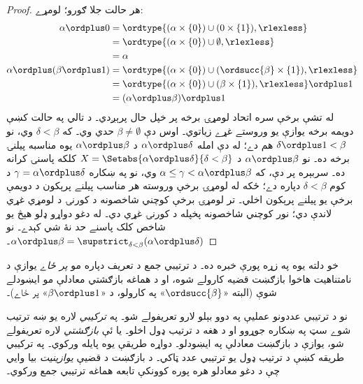 \documentclass[../../../include/open-logic-section]{subfiles}
\begin{document}
\begin{proof}
هر حالت جلا ګورو؛ لومړے:
\begin{align*}
	\alpha \ordplus  0
	& = \ordtype{(\alpha \times \{0\}) \cup (0 \times \{1\}), \rlexless} \\
	&= \ordtype{(\alpha \times \{0\}) \cup \emptyset, \rlexless}\\
	&= \alpha\\
	\alpha \ordplus (\beta \ordplus  1)
	&= \ordtype{(\alpha\times \{0\}) \cup (\ordsucc{\beta}\times \{1\}), \rlexless} \\
	&= \ordtype{(\alpha\times \{0\}) \cup (\beta \times \{1\}), \rlexless} \ordplus 1\\
	&= (\alpha \ordplus  \beta) \ordplus  1
\end{align*}
له تشې برخې سره اتحاد لومړۍ برخه پر خپل حال پرېږدي۔
د تالي په حالت کښې دويمه برخه يوازې يو وروستے غړے زياتوي۔
اوس دې $\beta \neq \emptyset$ حدي وي۔ که $\delta < \beta$ وي،
نو $\delta\ordplus 1 < \beta$ هم دے؛ له دې امله
$\alpha \ordplus  \delta$ د $\alpha \ordplus  \beta$ يوه
مناسبه پيلنۍ برخه ده۔ نو $\alpha \ordplus  \beta$ د
$X = \Setabs{\alpha \ordplus  \delta}{\delta < \beta}$ کلکه
پاسنۍ کرانه ده۔ سربېره پر دې، که
$\alpha \leq \gamma < \alpha \ordplus  \beta$ وي، نو په ښکاره
$\gamma = \alpha \ordplus \delta$ د کوم $\delta < \beta$
دپاره دے؛ ځکه له لومړۍ برخې وروسته هر مناسب پيلنے پرېکون
د دويمې برخې يو پيلنے پرېکون اخلي۔ تر لومړۍ برخې کوچني
شاخصونه د کورنۍ د لومړي غړي لاندې دي؛ نور کوچني شاخصونه
پخپله د کورنۍ غړي دي۔ له دغو دواړو ډلو هېڅ يو شاخص کلک
پاسنے حد نۀ شي کېدے۔ نو
$\alpha \ordplus  \beta = \supstrict_{\delta< \beta}(\alpha\ordplus \delta)$۔
\end{proof}

خو دلته يوه په زړه پورې خبره ده۔ د ترتيبي جمع د تعريف دپاره مو
\emph{پر ځاے} يوازې د نامتناهيت هاخوا بازګښت قضيه کارولے شوه،
او د  هماغه بازګشتي معادلې مو ايښودلے
شوې (البته «$\ordsucc{\beta}$» په کارولو، د
«$\beta \ordplus 1$» پر ځاے)۔

نو د ترتيبي عددونو عمليې په دوو بېلو لارو تعريفولے شو۔ په
\emph{ترکيبي} لاره يو ښه ترتيب شوے سټ په ښکاره جوړوو او د هغه
د ترتيب ډول اخلو۔ يا ئې \emph{بازګشتي} لاره تعريفولے شو، يوازې
د بازګښت معادلې په ايښودلو۔ دواړه طريقې يوه پايله ورکوي۔
 په ترکيبي
طريقه کښې د ترتيب ډول يو ترتيبي عدد ټاکي۔ د بازګښت د قضيې
\emph{يوازينيت} بيا وايي چې د دغو معادلو هره پوره کوونکې
تابعه هماغه ترتيبي جمع ورکوي۔
\end{document}
